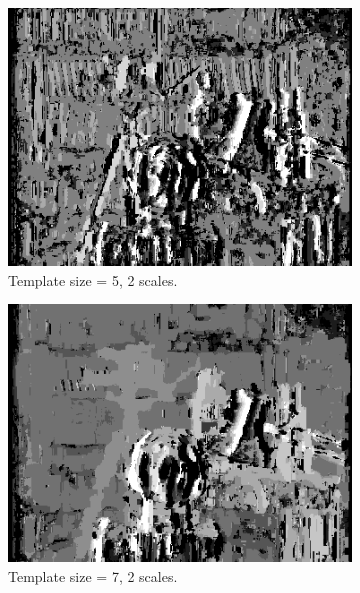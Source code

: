 \documentclass[12pt,a4paper,oneside,final]{article}
\begin{document}
\begin{figure}[H]
\ContinuedFloat
\begin{subfigure}[b]{0.24\textwidth}
	\includegraphics[width=\textwidth]{disparity_s2_k5.png}
	\caption{Template size = 5, 2 scales.}
\end{subfigure}
\begin{subfigure}[b]{0.24\textwidth}
	\includegraphics[width=\textwidth]{disparity_s2_k7.png}
	\caption{Template size = 7, 2 scales.}
\end{subfigure}
\begin{subfigure}[b]{0.24\textwidth}

\end{subfigure}
\end{figure}
\end{document}
